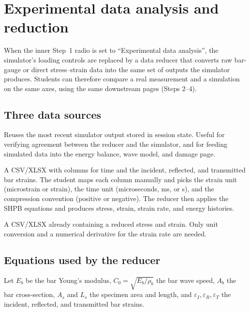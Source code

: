 \documentclass[11pt,a4paper,openany]{book}
\theoremstyle{handbook}
\newcommand{\eps}{\varepsilon}
\newcommand{\Cz}{C_0}
\newcommand{\Ab}{A_b}
\newcommand{\As}{A_s}
\newcommand{\Ls}{L_s}
\begin{document}
\chapter{Experimental data analysis and reduction}\label{ch:expdata}

When the inner Step~1 radio is set to ``Experimental data analysis'', the
simulator's loading controls are replaced by a data reducer that converts
raw bar-gauge or direct stress--strain data into the same set of outputs
the simulator produces. Students can therefore compare a real measurement
and a simulation on the same axes, using the same downstream pages (Steps
2--4).

\section{Three data sources}

\begin{description}[leftmargin=2em,style=nextline]
  \item[Latest simulator result]
    Reuses the most recent simulator output stored in session state.
    Useful for verifying agreement between the reducer and the simulator,
    and for feeding simulated data into the energy balance, wave model,
    and damage page.
  \item[Upload bar strain gauges]
    A CSV/XLSX with columns for time and the incident, reflected, and
    transmitted bar strains. The student maps each column manually and
    picks the strain unit (microstrain or strain), the time unit
    (microseconds, ms, or s), and the compression convention (positive or
    negative). The reducer then applies the SHPB equations and produces
    stress, strain, strain rate, and energy histories.
  \item[Upload direct stress--strain]
    A CSV/XLSX already containing a reduced stress and strain. Only unit
    conversion and a numerical derivative for the strain rate are
    needed.
\end{description}

\section{Equations used by the reducer}

Let $E_b$ be the bar Young's modulus, $\Cz=\sqrt{E_b/\rho_b}$ the bar
wave speed, $\Ab$ the bar cross-section, $\As$ and $\Ls$ the specimen
area and length, and $\eps_I,\eps_R,\eps_T$ the incident, reflected, and
transmitted bar strains.
\end{document}
